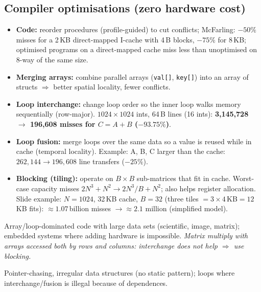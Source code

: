 \subsection{Compiler optimisations (zero hardware cost)}
\begin{itemize}
\item \textbf{Code:} reorder procedures (profile-guided) to cut conflicts; McFarling: $-50\%$ misses for a 2\,KB direct-mapped I-cache with 4\,B blocks, $-75\%$ for 8\,KB; optimised programs on a direct-mapped cache miss less than unoptimised on 8-way of the same size.
\item \textbf{Merging arrays:} combine parallel arrays (\texttt{val[]}, \texttt{key[]}) into an array of structs $\Rightarrow$ better spatial locality, fewer conflicts.
\item \textbf{Loop interchange:} change loop order so the inner loop walks memory sequentially (row-major). $1024\times1024$ ints, 64\,B lines (16 ints): \textbf{3{,}145{,}728 $\rightarrow$ 196{,}608 misses for $C=A+B$ ($-93.75\%$)}.
\item \textbf{Loop fusion:} merge loops over the same data so a value is reused while in cache (temporal locality). Example: A, B, C larger than the cache: $262{,}144 \rightarrow 196{,}608$ line transfers ($-25\%$).
\item \textbf{Blocking (tiling):} operate on $B\times B$ sub-matrices that fit in cache. Worst-case capacity misses $2N^3+N^2 \rightarrow 2N^3/B+N^2$; also helps register allocation. Slide example: $N=1024$, 32\,KB cache, $B=32$ (three tiles $=3\times4$\,KB$=12$\,KB fits): $\approx1.07$\,billion misses $\rightarrow\approx2.1$ million (simplified model).
\end{itemize}
\begin{pick}
Array/loop-dominated code with large data sets (scientific, image, matrix); embedded systems where adding hardware is impossible. \emph{Matrix multiply with arrays accessed both by rows and columns: interchange does not help $\Rightarrow$ use blocking.}
\end{pick}
\begin{avoid}
Pointer-chasing, irregular data structures (no static pattern); loops where interchange/fusion is illegal because of dependences.
\end{avoid}


